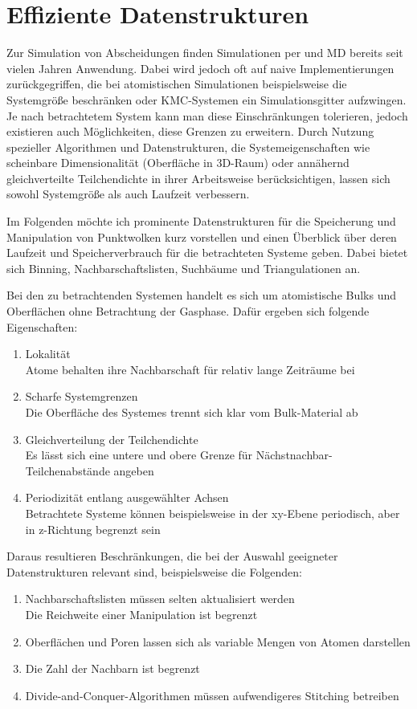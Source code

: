 \section{Effiziente Datenstrukturen}
\label{sec:datastructures}

Zur Simulation von Abscheidungen finden Simulationen per  und MD bereits seit vielen Jahren Anwendung.
Dabei wird jedoch oft auf naive Implementierungen zurückgegriffen, die bei atomistischen Simulationen beispielsweise die Systemgröße beschränken oder KMC-Systemen ein Simulationsgitter aufzwingen.
Je nach betrachtetem System kann man diese Einschränkungen tolerieren, jedoch existieren auch Möglichkeiten, diese Grenzen zu erweitern.
Durch Nutzung spezieller Algorithmen und Datenstrukturen, die Systemeigenschaften wie scheinbare Dimensionalität (Oberfläche in 3D-Raum) oder annähernd gleichverteilte Teilchendichte in ihrer Arbeitsweise berücksichtigen, lassen sich sowohl Systemgröße als auch Laufzeit verbessern.

Im Folgenden möchte ich prominente Datenstrukturen für die Speicherung und Manipulation von Punktwolken kurz vorstellen und einen Überblick über deren Laufzeit und Speicherverbrauch für die betrachteten Systeme geben.
Dabei bietet sich Binning, Nachbarschaftslisten, Suchbäume und Triangulationen an.

Bei den zu betrachtenden Systemen handelt es sich um atomistische Bulks und Oberflächen ohne Betrachtung der Gasphase.
Dafür ergeben sich folgende Eigenschaften:
\begin{enumerate}
\item Lokalität\\
  Atome behalten ihre Nachbarschaft für relativ lange Zeiträume bei
\item Scharfe Systemgrenzen\\
  Die Oberfläche des Systemes trennt sich klar vom Bulk-Material ab
\item Gleichverteilung der Teilchendichte\\
  Es lässt sich eine untere und obere Grenze für Nächstnachbar-Teilchenabstände angeben
\item Periodizität entlang ausgewählter Achsen\\
  Betrachtete Systeme können beispielsweise in der xy-Ebene periodisch, aber in z-Rich\-tung begrenzt sein
\end{enumerate}
Daraus resultieren Beschränkungen, die bei der Auswahl geeigneter Datenstrukturen relevant sind, beispielsweise die Folgenden:
\begin{enumerate}
\item Nachbarschaftslisten müssen selten aktualisiert werden\\
  Die Reichweite einer Manipulation ist begrenzt
\item Oberflächen und Poren lassen sich als variable Mengen von Atomen darstellen
\item Die Zahl der Nachbarn ist begrenzt
\item Divide-and-Conquer-Algorithmen müssen aufwendigeres Stitching betreiben
\end{enumerate}

